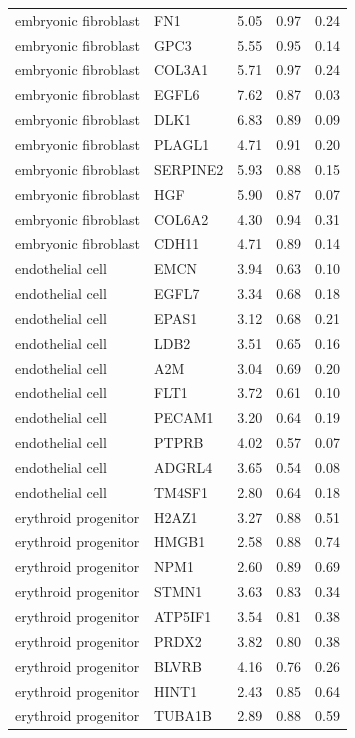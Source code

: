 \begin{longtable}{llccc}
embryonic fibroblast & FN1 & 5.05 & 0.97 & 0.24 \\
embryonic fibroblast & GPC3 & 5.55 & 0.95 & 0.14 \\
embryonic fibroblast & COL3A1 & 5.71 & 0.97 & 0.24 \\
embryonic fibroblast & EGFL6 & 7.62 & 0.87 & 0.03 \\
embryonic fibroblast & DLK1 & 6.83 & 0.89 & 0.09 \\
embryonic fibroblast & PLAGL1 & 4.71 & 0.91 & 0.20 \\
embryonic fibroblast & SERPINE2 & 5.93 & 0.88 & 0.15 \\
embryonic fibroblast & HGF & 5.90 & 0.87 & 0.07 \\
embryonic fibroblast & COL6A2 & 4.30 & 0.94 & 0.31 \\
embryonic fibroblast & CDH11 & 4.71 & 0.89 & 0.14 \\
endothelial cell & EMCN & 3.94 & 0.63 & 0.10 \\
endothelial cell & EGFL7 & 3.34 & 0.68 & 0.18 \\
endothelial cell & EPAS1 & 3.12 & 0.68 & 0.21 \\
endothelial cell & LDB2 & 3.51 & 0.65 & 0.16 \\
endothelial cell & A2M & 3.04 & 0.69 & 0.20 \\
endothelial cell & FLT1 & 3.72 & 0.61 & 0.10 \\
endothelial cell & PECAM1 & 3.20 & 0.64 & 0.19 \\
endothelial cell & PTPRB & 4.02 & 0.57 & 0.07 \\
endothelial cell & ADGRL4 & 3.65 & 0.54 & 0.08 \\
endothelial cell & TM4SF1 & 2.80 & 0.64 & 0.18 \\
erythroid progenitor & H2AZ1 & 3.27 & 0.88 & 0.51 \\
erythroid progenitor & HMGB1 & 2.58 & 0.88 & 0.74 \\
erythroid progenitor & NPM1 & 2.60 & 0.89 & 0.69 \\
erythroid progenitor & STMN1 & 3.63 & 0.83 & 0.34 \\
erythroid progenitor & ATP5IF1 & 3.54 & 0.81 & 0.38 \\
erythroid progenitor & PRDX2 & 3.82 & 0.80 & 0.38 \\
erythroid progenitor & BLVRB & 4.16 & 0.76 & 0.26 \\
erythroid progenitor & HINT1 & 2.43 & 0.85 & 0.64 \\
erythroid progenitor & TUBA1B & 2.89 & 0.88 & 0.59 \\

\end{longtable}

